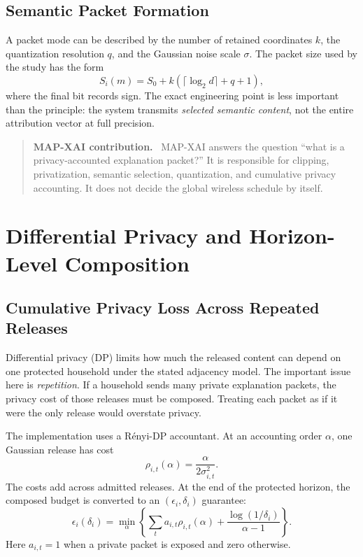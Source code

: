 \documentclass[11pt]{article}
\newenvironment{interpretationbox}[1]{%
  \begin{quote}\small\noindent\textbf{#1}\ }{\end{quote}}
\begin{document}
\subsection{Semantic Packet Formation}
A packet mode can be described by the number of retained coordinates $k$, the quantization resolution $q$, and the Gaussian noise scale $\sigma$. The packet size used by the study has the form
\[
S_i(m)=S_0+k(\lceil\log_2 d\rceil+q+1),
\]
where the final bit records sign. The exact engineering point is less important than the principle: the system transmits \emph{selected semantic content}, not the entire attribution vector at full precision.

\begin{interpretationbox}{MAP-XAI contribution.}
MAP-XAI answers the question ``what is a privacy-accounted explanation packet?'' It is responsible for clipping, privatization, semantic selection, quantization, and cumulative privacy accounting. It does not decide the global wireless schedule by itself.
\end{interpretationbox}

\section{Differential Privacy and Horizon-Level Composition}
\subsection{Cumulative Privacy Loss Across Repeated Releases}
Differential privacy (DP) limits how much the released content can depend on one protected household under the stated adjacency model. The important issue here is \emph{repetition}. If a household sends many private explanation packets, the privacy cost of those releases must be composed. Treating each packet as if it were the only release would overstate privacy.

The implementation uses a R\'enyi-DP accountant. At an accounting order $\alpha$, one Gaussian release has cost
\[
\rho_{i,t}(\alpha)=\frac{\alpha}{2\sigma_{i,t}^2}.
\]
The costs add across admitted releases. At the end of the protected horizon, the composed budget is converted to an $(\epsilon_i,\delta_i)$ guarantee:
\begin{equation}
\epsilon_i(\delta_i)=\min_{\alpha}
\left\{\sum_t a_{i,t}\rho_{i,t}(\alpha)+
\frac{\log(1/\delta_i)}{\alpha-1}\right\}.
\label{eq:tutorial-rdp}
\end{equation}
Here $a_{i,t}=1$ when a private packet is exposed and zero otherwise.
\end{document}

